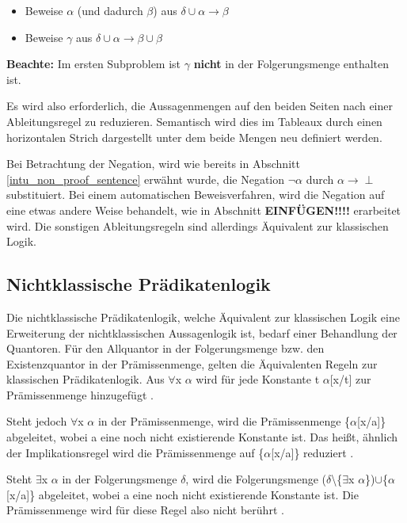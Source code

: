 \begin{itemize}
\item Beweise $\alpha$ (und dadurch $\beta$) aus $\delta\cup\alpha\rightarrow\beta$

\item Beweise $\gamma$ aus $\delta\cup\alpha\rightarrow\beta\cup\beta$
\end{itemize}

\textbf{Beachte:} Im ersten Subproblem ist $\gamma$ \textbf{nicht} in der Folgerungsmenge enthalten ist.

Es wird also erforderlich, die Aussagenmengen auf den beiden Seiten nach einer Ableitungsregel zu reduzieren. Semantisch wird dies im Tableaux durch einen horizontalen Strich dargestellt unter dem beide Mengen neu definiert werden.

Bei Betrachtung der Negation, wird wie bereits in Abschnitt \ref{intu_non_proof_sentence} erwähnt wurde, die Negation $\neg\alpha$ durch $\alpha\rightarrow\perp$ substituiert. Bei einem automatischen Beweisverfahren, wird die Negation auf eine etwas andere Weise behandelt, wie in Abschnitt \textbf{EINFÜGEN!!!!} erarbeitet wird. Die sonstigen Ableitungsregeln sind allerdings Äquivalent zur klassischen Logik.

\subsection{Nichtklassische Prädikatenlogik}
Die nichtklassische Prädikatenlogik, welche Äquivalent zur klassischen Logik eine Erweiterung der nichtklassischen Aussagenlogik ist, bedarf einer Behandlung der Quantoren.   Für den Allquantor in der Folgerungsmenge bzw. den Existenzquantor in der Prämissenmenge, gelten die Äquivalenten Regeln zur klassischen Prädikatenlogik. Aus $\forall$x $\alpha$ wird für jede Konstante t $\alpha$[x/t] zur Prämissenmenge hinzugefügt \cite{DGHP99}.

Steht jedoch $\forall$x $\alpha$ in der Prämissenmenge, wird die Prämissenmenge \{$\alpha$[x/a]\} abgeleitet, wobei a eine noch nicht existierende Konstante ist. Das heißt, ähnlich der Implikationsregel wird die Prämissenmenge auf \{$\alpha$[x/a]\} reduziert \cite{DGHP99}.

Steht $\exists$x $\alpha$ in der Folgerungsmenge $\delta$, wird die Folgerungsmenge ($\delta$\textbackslash \{$\exists$x $\alpha$\})$\cup$\{$\alpha$[x/a]\} abgeleitet, wobei a eine noch nicht existierende Konstante ist. Die Prämissenmenge wird für diese Regel also nicht berührt \cite{DGHP99}.



